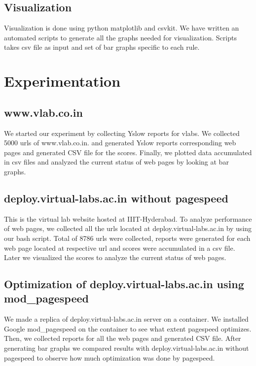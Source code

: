 \documentclass[conference]{IEEEtran}
\begin{document}
\subsection{Visualization}\label{sec-4.3}
Visualization is done using python matplotlib and csvkit. We have written an automated
scripts to generate all the graphs needed for visualization. Scripts takes csv file as input
and set of bar graphs specific to each rule.

\section{Experimentation}\label{sec-5}

\subsection{www.vlab.co.in}\label{sec-5.1}
We started our experiment by collecting Yslow reports for vlabs. 
We collected 5000 urls of www.vlab.co.in. and generated
Yslow reports corresponding web pages and generated CSV file for the
scores. Finally, we plotted data accumulated in csv files and analyzed the
current status of web pages by looking at bar graphs.

\subsection{deploy.virtual-labs.ac.in without pagespeed}\label{sec-5.2}
This is the virtual lab website hosted at IIIT-Hyderabad. To analyze performance
of web pages, we collected all the urls located at deploy.virtual-labs.ac.in by using
our bash script. Total of 8786 urls were collected, reports were
generated for each web page located at respective url and scores were accumulated in a csv file.
Later we visualized the scores to analyze the current status of web pages.

\subsection{Optimization of deploy.virtual-labs.ac.in using mod\_pagespeed}\label{sec-5.3}
We made a replica of deploy.virtual-labs.ac.in server on a container. We installed
Google mod\_pagespeed on the container to see what extent pagespeed optimizes.
Then, we collected reports for all the web pages and
generated CSV file. After generating bar graphs we compared results with deploy.virtual-labs.ac.in without pagespeed
to observe how much optimization was done by pagespeed.
\end{document}
